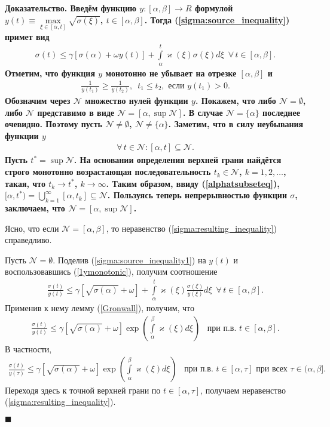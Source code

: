 \documentclass{report}
\newenvironment{Proof}{\par\noindent\bf Доказательство.\rm}{ $\blacksquare$\par}
\begin{document}
\begin{Proof}
Введём функцию $y\colon[\alpha,\beta]\to R$ формулой $y(t)\equiv\max\limits_{\xi\in[\alpha,t]} \sqrt{\sigma(\xi)}$, $t\in[\alpha,\beta]$. Тогда (\ref{sigma:source_inequality}) примет вид
\begin{gather}\label{sigma:source_inequality1}
\sigma(t)\leqslant\gamma[\sigma(\alpha)+\omega y(t)]+ \int\limits_\alpha^t\varkappa(\xi)\sigma(\xi)d\xi\,\,\,\forall\,t\in[\alpha,\beta].
\end{gather}
Отметим, что функция $y$ монотонно не убывает на отрезке $[\alpha,\beta]$ и
\begin{gather}\label{1ymonotonic}
\frac1{y(t_1)}\geqslant\frac1{y(t_2)},\,\,\,t_1\leqslant t_2, \mbox{ если $y(t_1)>0$.}
\end{gather}
Обозначим через $\mathcal{N}$ множество нулей функции $y$. Покажем, что либо $\mathcal{N}= \emptyset$, либо $\mathcal{N}$ представимо в виде $\mathcal{N}=[\alpha,\sup\mathcal{N}]$. В случае
$\mathcal{N}=\{\alpha\}$ последнее очевидно. Поэтому пусть $\mathcal{N}\neq\emptyset$, $\mathcal{N}\neq\{\alpha\}$. Заметим, что в силу неубывания функции $y$
\begin{gather}\label{alphatsubseteq}
\forall\,t\in\mathcal{N}:[\alpha,t]\subseteq\mathcal{N}.
\end{gather}
Пусть $t^*=\sup\mathcal{N}$. На основании определения верхней грани найдётся строго монотонно возрастающая последовательность $t_k\in\mathcal{N}$, $k=1,2,\dots$, такая, что $t_k\to t^*$,
$k\to\infty$. Таким образом, ввиду (\ref{alphatsubseteq}), $[\alpha,t^*)=\bigcup\limits_{k=1}^\infty[\alpha,t_k]\subseteq\mathcal{N}$. Пользуясь теперь непрерывностью функции $\sigma$,
заключаем, что $\mathcal{N}=[\alpha,\sup\mathcal{N}]$.

Ясно, что если $\mathcal{N}=[\alpha,\beta]$, то неравенство (\ref{sigma:resulting_inequality}) справедливо.

Пусть $\mathcal{N}=\emptyset$. Поделив (\ref{sigma:source_inequality1}) на $y(t)$ и воспользовавшись (\ref{1ymonotonic}), получим соотношение
\begin{gather*}
\frac{\sigma(t)}{y(t)}\leqslant\gamma[\sqrt{\sigma(\alpha)}+ \omega]+\int\limits_\alpha^t\varkappa(\xi)\frac{\sigma(\xi)}{y(\xi)}d\xi\,\,\,\forall\,t\in[\alpha,\beta].
\end{gather*}
Применив к нему лемму (\ref{Gronwall}), получим, что
\begin{gather*}
\frac{\sigma(t)}{y(t)}\leqslant\gamma[\sqrt{\sigma(\alpha)}+\omega] \exp\left(\int\limits_\alpha^\beta\varkappa(\xi)d\xi\right)\,\,\,\mbox{ при п.в. $t\in[\alpha,\beta]$}.
\end{gather*}
В частности,
\begin{gather*}
\frac{\sigma(t)}{y(\tau)}\leqslant\gamma[\sqrt{\sigma(\alpha)}+\omega] \exp\left(\int\limits_\alpha^\beta\varkappa(\xi)d\xi\right)\,\,\,
\mbox{ при п.в. $t\in[\alpha,\tau]$ при всех $\tau\in(\alpha,\beta]$}.
\end{gather*}
Переходя здесь к точной верхней грани по $t\in[\alpha,\tau]$, получаем неравенство (\ref{sigma:resulting_inequality}).


\end{Proof}
\end{document}

